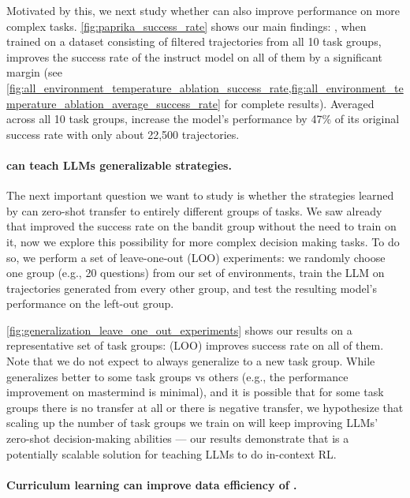 Motivated by this, we next study whether \ours{} can also improve performance on more complex tasks. \cref{fig:paprika_success_rate} shows our main findings: \ours{}, when trained on a dataset consisting of filtered trajectories from all 10 task groups, improves the success rate of the instruct model on all of them by a significant margin (see \cref{fig:all_environment_temperature_ablation_success_rate,fig:all_environment_temperature_ablation_average_success_rate} for complete results). %
Averaged across all 10 task groups, \ours{} increase the model's performance by 47\% of its original success rate with only about 22,500 trajectories.

\paragraph{\ours{} can teach LLMs generalizable strategies.}

The next important question we want to study is whether the strategies learned by \ours{} can zero-shot transfer to entirely different groups of tasks. We saw already that \ours{} improved the success rate on the bandit group without the need to train on it, now we explore this possibility for more complex decision making tasks. To do so, we perform a set of leave-one-out (LOO) experiments: we randomly choose one group (e.g., 20 questions) from our set of environments, train the LLM on trajectories generated from every other group, and test the resulting model's performance on the left-out group. 

\cref{fig:generalization_leave_one_out_experiments} shows our results on a representative set of task groups: \ours{} (LOO) improves success rate on all of them. Note that we do not expect \ours{} to always generalize to a new task group. While \ours{} generalizes better to some task groups vs others (e.g., the performance improvement on mastermind is minimal), and it is possible that for some task groups there is no transfer at all or there is negative transfer, we hypothesize that scaling up the number of task groups we train on will keep improving LLMs' zero-shot decision-making abilities --- our results demonstrate that \ours{} is a potentially scalable solution for teaching LLMs to do in-context RL.



\paragraph{Curriculum learning can improve data efficiency of \ours{}.}



